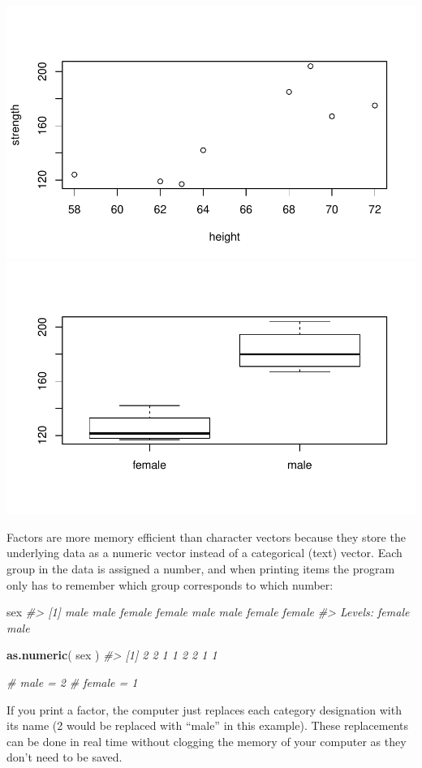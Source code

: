 \documentclass[]{book}
\newenvironment{Shaded}{\begin{snugshade}}{\end{snugshade}}
\newcommand{\CommentTok}[1]{\textcolor[rgb]{0.56,0.35,0.01}{\textit{#1}}}
\newcommand{\KeywordTok}[1]{\textcolor[rgb]{0.13,0.29,0.53}{\textbf{#1}}}
\newcommand{\NormalTok}[1]{#1}
\theoremstyle{definition}
\theoremstyle{definition}
\theoremstyle{definition}
\theoremstyle{remark}
\begin{document}
\begin{center}\includegraphics[width=0.7\linewidth]{DS4PS-I_files/figure-latex/unnamed-chunk-69-1} \includegraphics[width=0.7\linewidth]{DS4PS-I_files/figure-latex/unnamed-chunk-69-2} \end{center}

Factors are more memory efficient than character vectors because they
store the underlying data as a numeric vector instead of a categorical
(text) vector. Each group in the data is assigned a number, and when
printing items the program only has to remember which group corresponds
to which number:

\begin{Shaded}
\begin{Highlighting}[]
\NormalTok{sex}
\CommentTok{#> [1] male   male   female female male   male   female female}
\CommentTok{#> Levels: female male}

\KeywordTok{as.numeric}\NormalTok{( sex )}
\CommentTok{#> [1] 2 2 1 1 2 2 1 1}

\CommentTok{#  male = 2}
\CommentTok{#  female = 1}
\end{Highlighting}
\end{Shaded}

If you print a factor, the computer just replaces each category
designation with its name (2 would be replaced with ``male'' in this
example). These replacements can be done in real time without clogging
the memory of your computer as they don't need to be saved.
\end{document}
